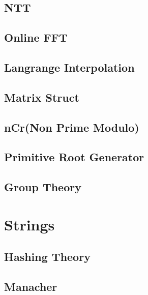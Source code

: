 \subsection{NTT}
\raggedbottom
\subsection{Online FFT}
\raggedbottom
\subsection{Langrange Interpolation}
\raggedbottom
\subsection{Matrix Struct}
\raggedbottom
\subsection{nCr(Non Prime Modulo)}
\raggedbottom
\subsection{Primitive Root Generator}
\raggedbottom

\subsection{Group Theory}
\raggedbottom

\section{Strings}
\subsection{Hashing Theory}
\raggedbottom
\subsection{Manacher}
\raggedbottom
